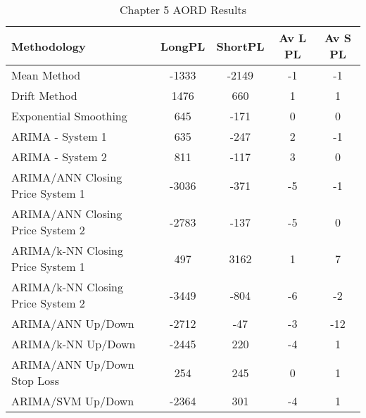 \begin{table}[ht]
\centering
\caption[Chapter 5 AORD Results]{Chapter 5 AORD Results} 
\label{tab:chp6:aord2_summary}
\begin{tabular}{lcccc}
  \toprule Methodology & LongPL & ShortPL & Av L PL & Av S PL \\ 
  \midrule Mean Method & -1333 & -2149 & -1 & -1 \\ 
  Drift Method & 1476 & 660 & 1 & 1 \\ 
  Exponential Smoothing & 645 & -171 & 0 & 0 \\ 
  ARIMA - System 1 & 635 & -247 & 2 & -1 \\ 
  ARIMA - System 2 & 811 & -117 & 3 & 0 \\ 
  ARIMA/ANN Closing Price System 1 & -3036 & -371 & -5 & -1 \\ 
  ARIMA/ANN Closing Price System 2 & -2783 & -137 & -5 & 0 \\ 
  ARIMA/k-NN Closing Price System 1 & 497 & 3162 & 1 & 7 \\ 
  ARIMA/k-NN Closing Price System 2 & -3449 & -804 & -6 & -2 \\ 
  ARIMA/ANN Up/Down & -2712 & -47 & -3 & -12 \\ 
  ARIMA/k-NN Up/Down & -2445 & 220 & -4 & 1 \\ 
  ARIMA/ANN Up/Down Stop Loss & 254 & 245 & 0 & 1 \\ 
  ARIMA/SVM Up/Down & -2364 & 301 & -4 & 1 \\ 
   \bottomrule \end{tabular}
\end{table}
